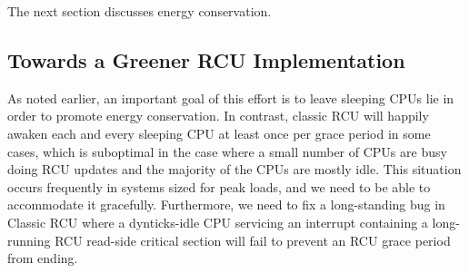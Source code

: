 The next section discusses energy conservation.

\subsection{Towards a Greener RCU Implementation}
\label{app:rcuimpl:rcutree:Towards a Greener RCU Implementation}

As noted earlier, an important goal of this effort is to leave sleeping
CPUs lie in order to promote energy conservation.
In contrast, classic RCU will happily awaken each and every sleeping CPU
at least once per grace period in some cases,
which is suboptimal in the case where
a small number of CPUs are busy doing RCU updates and the majority of
the CPUs are mostly idle.
This situation occurs frequently in systems sized for peak loads, and
we need to be able to accommodate it gracefully.
Furthermore, we need to fix a long-standing bug in Classic RCU where
a dynticks-idle CPU servicing an interrupt containing a long-running
RCU read-side critical section will fail to prevent an RCU grace period
from ending.

 \QuickQuizEnd

